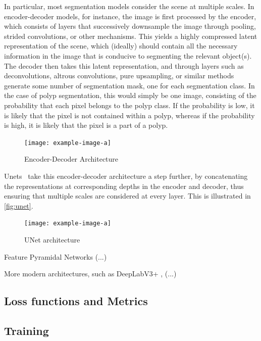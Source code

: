     In particular, most segmentation models consider the scene at multiple scales. In encoder-decoder models, for instance, the image is first processed by the encoder, which consists of layers that successively downsample the image through pooling, strided convolutions, or other mechanisms. This yields a highly compressed latent representation of the scene, which (ideally) should contain all the necessary information in the image that is conducive to segmenting the relevant object(s). The decoder then takes this latent representation, and through layers such as deconvolutions, altrous convolutions, pure upsampling, or similar methods generate some number of segmentation mask, one for each segmentation class. In the case of polyp segmentation, this would simply be one image, consisting of the probability that each pixel belongs to the polyp class. If the probability is low, it is likely that the pixel is not contained within a polyp, whereas if the probability is high, it is likely that the pixel is a part of a polyp. 
    
      \begin{figure}
        \centering
        \texttt{[image: example-image-a]}
        \caption{Encoder-Decoder Architecture}
        \label{fig:unet}
    \end{figure}
    
    
    Unets~\cite{unet} take this encoder-decoder architecture a step further, by concatenating the representations at corresponding depths in the encoder and decoder, thus ensuring that multiple scales are considered at every layer. This is illustrated in \autoref{fig:unet}.  
    
    \begin{figure}
        \centering
        \texttt{[image: example-image-a]}
        \caption{UNet architecture}
        \label{fig:unet}
    \end{figure}
    
    Feature Pyramidal Networks (...)
    
    More modern architectures, such as DeepLabV3+ \cite{deeplab}, (...)
    
    
    
    
    
    
    \subsection{Loss functions and Metrics}
    
    \subsection{Training}
    

